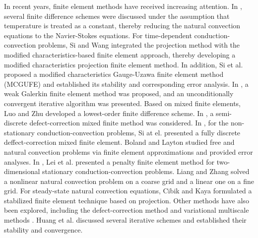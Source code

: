 \documentclass[10pt]{article}
\begin{document}
	In recent years, finite element methods have received increasing attention. In \cite{FU1994,XIN1989}, several finite difference schemes were discussed under the assumption that temperature is treated as a constant, thereby reducing the natural convection equations to the Navier-Stokes equations. For time-dependent conduction-convection problems, Si and Wang \cite{Si2015} integrated the projection method with the modified characteristics-based finite element approach, thereby developing a modified characteristics projection finite element method. In addition, Si et al. \cite{Si2014} proposed a modified characteristics Gauge-Uzawa finite element method (MCGUFE) and established its stability and corresponding error analysis. In \cite{Han2019}, a weak Galerkin finite element method was proposed, and an unconditionally convergent iterative algorithm was presented. Based on mixed finite elements, Luo and Zhu \cite{LUO2003} developed a lowest-order finite difference scheme. In \cite{Si2011}, a semi-discrete defect-correction mixed finite method was considered. In \cite{Si2012}, for the non-stationary conduction-convection problems, Si at el. presented a fully discrete deffect-correction mixed finite element.  Boland and Layton \cite{J1990} studied free and natural convection problems via finite element approximations and provided error analyses. In \cite{LYF2018}, Lei et al. presented a penalty finite element method for two-dimensional stationary conduction-convection problems.  Liang and Zhang \cite{Liang2019} solved a nonlinear natural convection problem on a coarse grid and a linear one on a fine grid. For steady-state natural convection equations, Cibik and Kaya \cite{A2011} formulated a stabilized finite element technique based on projection. Other methods have also been explored, including the defect-correction method \cite{Yun2014} and variational multiscale methods \cite{Yun2013}. Huang et al. \cite{Huang2015} discussed several iterative schemes and established their stability and convergence.    
	
\end{document}
